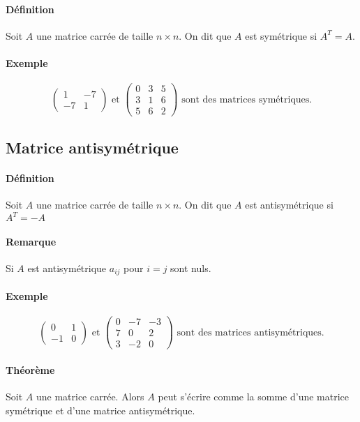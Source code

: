 \paragraph{Définition} Soit $A$ une matrice carrée de taille $n\times n$. On dit que $A$ est symétrique si $A^{T} = A$.

\paragraph{Exemple}$$\begin{pmatrix}1&-7\\-7&1\end{pmatrix} \text{ et }\begin{pmatrix}0&3&5\\3&1&6\\5&6&2\end{pmatrix}\text{ sont des matrices symétriques.}$$

%
\subsection{Matrice antisymétrique}
%
\paragraph{Définition} Soit $A$ une matrice carrée de taille $n\times n$. On dit que $A$ est antisymétrique si $A^{T} = -A$
\paragraph{Remarque} Si $A$ est antisymétrique $a_{ij}$ pour $i=j$ sont nuls.

\paragraph{Exemple}$$\begin{pmatrix}0&1\\-1&0\end{pmatrix} \text{ et }\begin{pmatrix}0&-7&-3\\7&0&2\\3&-2&0\end{pmatrix}\text{ sont des matrices antisymétriques.}$$

\paragraph{Théorème} Soit $A$ une matrice carrée. Alors $A$ peut s'écrire comme la somme d'une matrice symétrique et d'une matrice antisymétrique.

